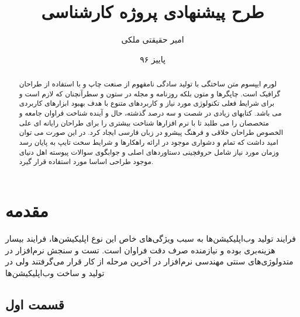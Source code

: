 \documentclass{report}
\title{طرح پیشنهادی پروژه کارشناسی}
\author{امیر حقیقتی ملکی}
\date{پاییز ۹۶}
\theoremstyle{definition}
\begin{document}
	\begin{titlepage}
		
		
	\end{titlepage}
	\newpage
	\begin{abstract}
		\thispagestyle{plain}
		لورم ایپسوم متن ساختگی با تولید سادگی نامفهوم از صنعت چاپ و با استفاده از طراحان گرافیک است. چاپگرها و متون بلکه روزنامه و مجله در ستون و سطرآنچنان که لازم است و برای شرایط فعلی تکنولوژی مورد نیاز و کاربردهای متنوع با هدف بهبود ابزارهای کاربردی می باشد. کتابهای زیادی در شصت و سه درصد گذشته، حال و آینده شناخت فراوان جامعه و متخصصان را می طلبد تا با نرم افزارها شناخت بیشتری را برای طراحان رایانه ای علی الخصوص طراحان خلاقی و فرهنگ پیشرو در زبان فارسی ایجاد کرد. در این صورت می توان امید داشت که تمام و دشواری موجود در ارائه راهکارها و شرایط سخت تایپ به پایان رسد وزمان مورد نیاز شامل حروفچینی دستاوردهای اصلی و جوابگوی سوالات پیوسته اهل دنیای موجود طراحی اساسا مورد استفاده قرار گیرد.
	\end{abstract}
	\newpage
	\tableofcontents
	\newpage
	\chapter{مقدمه}
	فرایند تولید وب‌اپلیکیشن‌ها به سبب ویژگی‌های خاص این نوع اپلیکیشن‌ها، فرایند بیسار هزینه‌بری بوده و نیازمنده صرف دقت فراوان است. تست و سنجش نرم‌افزار در متدولوژی‌های سنتی مهندسی نرم‌افزار در آخرین مرحله از کار قرار می‌گرفتند ولی در تولید و ساخت وب‌اپلیکیشن‌ها 
	\section{قسمت اول}
	
\end{document}
